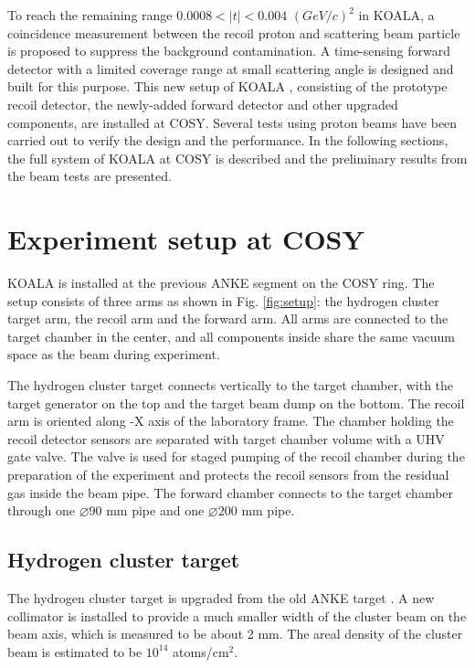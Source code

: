 \documentclass[number,5p]{elsarticle}
\begin{document}
To reach the remaining range \(0.0008 < |t| < 0.004\) \((GeV/c)^2\) in KOALA, a coincidence measurement between the recoil proton and scattering beam particle is proposed to suppress the background contamination.
A time-sensing forward detector with a limited coverage range at small scattering angle is designed and built for this purpose. 
This new setup of KOALA , consisting of the prototype recoil detector, the newly-added forward detector and other upgraded components,  are installed at COSY.
Several tests using proton beams have been carried out to verify the design and the performance.
In the following sections,  the full system of KOALA at COSY is described and the preliminary results from the beam tests are presented.

\section{Experiment setup at COSY}
\label{sec:setup}

KOALA is installed at the previous ANKE segment on the COSY ring.
The setup consists of three arms as shown in Fig. \ref{fig:setup}: the hydrogen
cluster target arm, the recoil arm and the forward arm.
All arms are connected to the target chamber in the center, and all components
inside share the same vacuum space as the beam during experiment.

The hydrogen cluster target connects vertically to the target chamber, with the target generator on the top and the target beam dump on the bottom.
The recoil arm is oriented along -X axis of the laboratory frame.
The chamber holding the recoil detector sensors are separated with target chamber volume with a UHV gate valve.
The valve is used for staged pumping of the recoil chamber during the
preparation of the experiment and protects the recoil sensors from the residual
gas inside the beam pipe.
The forward chamber connects to the target chamber through one \(\diameter 90\) mm pipe and one \(\diameter 200\) mm pipe. 

\subsection{Hydrogen cluster target}
\label{sec:target}

The hydrogen cluster target is upgraded from the old ANKE target \cite{cluster_target}.
A new collimator is installed to provide a much smaller width of the cluster beam on the beam axis, which is measured to be about 2 mm.
The areal density of the cluster beam is estimated to be \(10^{14}\) atoms/cm$^2$.
\end{document}

